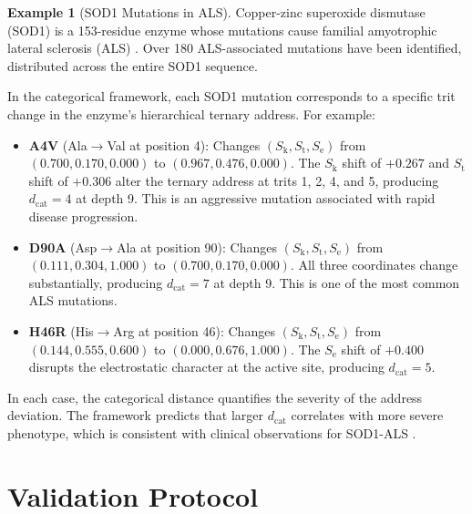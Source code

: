 \documentclass[11pt,twocolumn,a4paper]{article}
\theoremstyle{definition}
\newtheorem{example}[theorem]{Example}
\theoremstyle{remark}
\newcommand{\Sk}{S_{\mathrm{k}}}
\newcommand{\St}{S_{\mathrm{t}}}
\newcommand{\Se}{S_{\mathrm{e}}}
\begin{document}
\begin{example}[SOD1 Mutations in ALS]
\label{ex:sod1}
Copper-zinc superoxide dismutase (SOD1) is a 153-residue enzyme whose mutations cause familial amyotrophic lateral sclerosis (ALS) \citep{rosen1993}. Over 180 ALS-associated mutations have been identified, distributed across the entire SOD1 sequence.

In the categorical framework, each SOD1 mutation corresponds to a specific trit change in the enzyme's hierarchical ternary address. For example:

\begin{itemize}[nosep]
\item \textbf{A4V} (Ala$\to$Val at position 4): Changes $(\Sk, \St, \Se)$ from $(0.700, 0.170, 0.000)$ to $(0.967, 0.476, 0.000)$. The $\Sk$ shift of $+0.267$ and $\St$ shift of $+0.306$ alter the ternary address at trits 1, 2, 4, and 5, producing $d_{\mathrm{cat}} = 4$ at depth 9. This is an aggressive mutation associated with rapid disease progression.

\item \textbf{D90A} (Asp$\to$Ala at position 90): Changes $(\Sk, \St, \Se)$ from $(0.111, 0.304, 1.000)$ to $(0.700, 0.170, 0.000)$. All three coordinates change substantially, producing $d_{\mathrm{cat}} = 7$ at depth 9. This is one of the most common ALS mutations.

\item \textbf{H46R} (His$\to$Arg at position 46): Changes $(\Sk, \St, \Se)$ from $(0.144, 0.555, 0.600)$ to $(0.000, 0.676, 1.000)$. The $\Se$ shift of $+0.400$ disrupts the electrostatic character at the active site, producing $d_{\mathrm{cat}} = 5$.
\end{itemize}

In each case, the categorical distance quantifies the severity of the address deviation. The framework predicts that larger $d_{\mathrm{cat}}$ correlates with more severe phenotype, which is consistent with clinical observations for SOD1-ALS \citep{rosen1993}.
\end{example}


\part{Validation Protocol}
\end{document}
